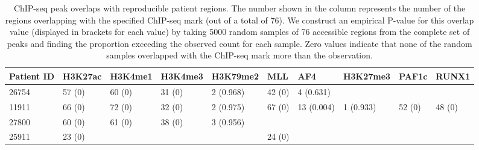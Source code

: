 \begin{table}

    \centering
    \tiny
    \begin{tabular}[t]{llllllllll}
    \toprule
    Patient ID & H3K27ac & H3K4me1 & H3K4me3 & H3K79me2 & MLL & AF4 & H3K27me3 & PAF1c & RUNX1\\
    \midrule
    26754 & 57 (0) & 60 (0) & 31 (0) & 2 (0.968) & 42 (0) & 4 (0.631) &   &   &  \\
    11911 & 66 (0) & 72 (0) & 32 (0) & 2 (0.975) & 67 (0) & 13 (0.004) & 1 (0.933) & 52 (0) & 48 (0)\\
    27800 & 60 (0) & 61 (0) & 38 (0) & 3 (0.956) &   &   &   &   &  \\
    25911 & 23 (0) &   &   &   & 24 (0) &   &   &   &  \\
    \bottomrule
    \end{tabular}
    \caption{ChIP-seq peak overlaps with reproducible patient regions. The number shown in the column represents the number of the regions overlapping with the specified ChIP-seq mark (out of a total of 76). We construct an empirical P-value for this overlap value (displayed in brackets for each value) by taking 5000 random samples of 76 accessible regions from the complete set of peaks and finding the proportion exceeding the observed count for each sample. Zero values indicate that none of the random samples overlapped with the ChIP-seq mark more than the observation.}
    \label{table:mll_chip}
    \end{table}


